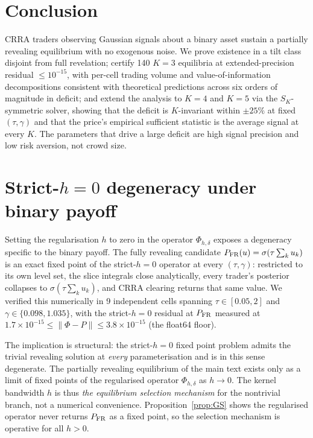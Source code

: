 \documentclass[11pt]{article}
\newcommand{\1}{\mathbf{1}}
\begin{document}
\section{Conclusion}

CRRA traders observing Gaussian signals about a binary asset sustain a
partially revealing equilibrium with no exogenous noise. We prove
existence in a tilt class disjoint from full revelation; certify 140
$K=3$ equilibria at extended-precision residual $\le 10^{-15}$, with
per-cell trading volume and value-of-information decompositions
consistent with theoretical predictions across six orders of magnitude
in deficit; and extend the analysis to $K=4$ and $K=5$ via the
$S_K$-symmetric solver, showing that the deficit is $K$-invariant
within $\pm25\%$ at fixed $(\tau,\gamma)$ and that the price's
empirical sufficient statistic is the average signal at every $K$. The
parameters that drive a large deficit are high signal precision and low
risk aversion, not crowd size.

\appendix
\section{Strict-$h{=}0$ degeneracy under binary payoff}\label{app:degeneracy}

Setting the regularisation $h$ to zero in the operator $\Phi_{h,\delta}$
exposes a degeneracy specific to the binary payoff. The fully revealing
candidate $P_{\rm FR}(u)=\sigma(\tau\sum_k u_k)$ is an exact fixed point
of the strict-$h{=}0$ operator at every $(\tau,\gamma)$: restricted to its
own level set, the slice integrals close analytically, every trader's
posterior collapses to $\sigma(\tau\sum_k u_k)$, and CRRA clearing returns
that same value. We verified this numerically in 9 independent cells
spanning $\tau\in[0.05,2]$ and $\gamma\in\{0.098,1.035\}$, with the
strict-$h{=}0$ residual at $P_{\rm FR}$ measured at
$1.7\times10^{-15}\le\|\Phi-P\|\le 3.8\times10^{-15}$ (the float64 floor).

The implication is structural: the strict-$h{=}0$ fixed point problem
admits the trivial revealing solution at \emph{every} parameterisation
and is in this sense degenerate. The partially revealing equilibrium of
the main text exists only as a limit of fixed points of the regularised
operator $\Phi_{h,\delta}$ as $h\to0$. The kernel bandwidth $h$ is thus
\emph{the equilibrium selection mechanism} for the nontrivial branch,
not a numerical convenience. Proposition~\ref{prop:GS} shows the
regularised operator never returns $P_{\rm FR}$ as a fixed point, so
the selection mechanism is operative for all $h>0$.
\end{document}
